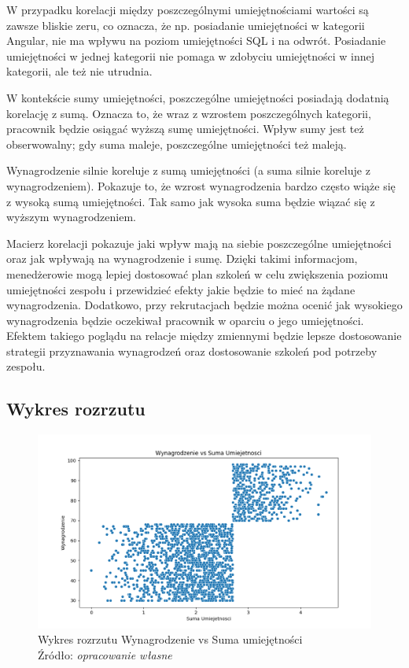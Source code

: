     \par W przypadku korelacji między poszczególnymi umiejętnościami wartości są zawsze bliskie zeru, co oznacza, że np. posiadanie umiejętności w kategorii Angular, nie ma wpływu na poziom umiejętności SQL i na odwrót. Posiadanie umiejętności w jednej kategorii nie pomaga w zdobyciu umiejętności w innej kategorii, ale też nie utrudnia. 
    
    \par W kontekście sumy umiejętności, poszczególne umiejętności posiadają dodatnią korelację z sumą. Oznacza to, że wraz z wzrostem poszczególnych kategorii, pracownik będzie osiągać wyższą sumę umiejętności. Wpływ sumy jest też obserwowalny; gdy suma maleje, poszczególne umiejętności też maleją.

    \par Wynagrodzenie silnie koreluje z sumą umiejętności (a suma silnie koreluje z wynagrodzeniem). Pokazuje to, że wzrost wynagrodzenia bardzo często wiąże się z wysoką sumą umiejętności. Tak samo jak wysoka suma będzie wiązać się z wyższym wynagrodzeniem.

    \par Macierz korelacji pokazuje jaki wpływ mają na siebie poszczególne umiejętności oraz jak wpływają na wynagrodzenie i sumę. Dzięki takimi informacjom, menedżerowie mogą lepiej dostosować plan szkoleń w celu zwiększenia poziomu umiejętności zespołu i przewidzieć efekty jakie będzie to mieć na żądane wynagrodzenia. Dodatkowo, przy rekrutacjach będzie można ocenić jak wysokiego wynagrodzenia będzie oczekiwał pracownik w oparciu o jego umiejętności. Efektem takiego poglądu na relacje między zmiennymi będzie lepsze dostosowanie strategii przyznawania wynagrodzeń oraz dostosowanie szkoleń pod potrzeby zespołu. 
    
    \subsection{Wykres rozrzutu}\label{subsec:scatter}
    \begin{figure}[H]
        \centering
        \includegraphics[width=\linewidth]{chapters/Images/rozrzut.png}
        \cprotect\caption{Wykres rozrzutu Wynagrodzenie vs Suma umiejętności\\ Źródło:\textit{ opracowanie własne}}
        \label{fig:scatter_plot}
    \end{figure}

